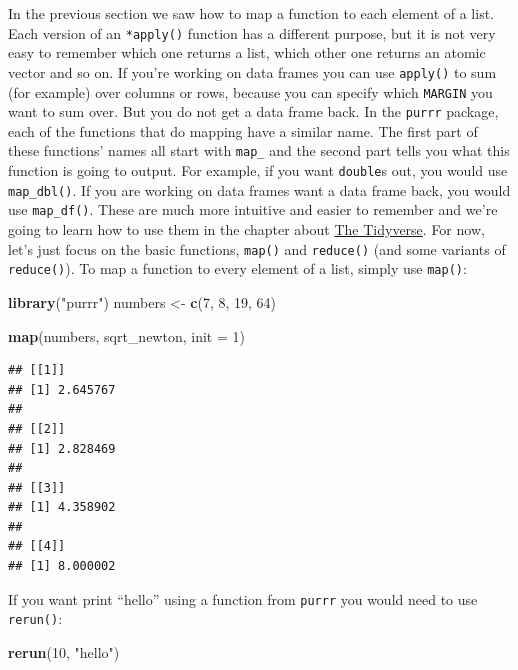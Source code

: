 \documentclass[]{gitbook}
\newenvironment{Shaded}{\begin{snugshade}}{\end{snugshade}}
\newcommand{\DataTypeTok}[1]{\textcolor[rgb]{0.13,0.29,0.53}{#1}}
\newcommand{\DecValTok}[1]{\textcolor[rgb]{0.00,0.00,0.81}{#1}}
\newcommand{\KeywordTok}[1]{\textcolor[rgb]{0.13,0.29,0.53}{\textbf{#1}}}
\newcommand{\NormalTok}[1]{#1}
\newcommand{\StringTok}[1]{\textcolor[rgb]{0.31,0.60,0.02}{#1}}
\begin{document}
In the previous section we saw how to map a function to each element of a list. Each version of an
\texttt{*apply()} function has a different purpose, but it is not very easy to remember which one returns
a list, which other one returns an atomic vector and so on. If you're working on data frames you
can use \texttt{apply()} to sum (for example) over columns or rows, because you can specify which \texttt{MARGIN}
you want to sum over. But you do not get a data frame back. In the \texttt{purrr} package, each of the
functions that do mapping have a similar name. The first part of these functions' names all start
with \texttt{map\_} and the second part tells you what this function is going to output. For example, if
you want \texttt{double}s out, you would use \texttt{map\_dbl()}. If you are working on data frames want a data
frame back, you would use \texttt{map\_df()}. These are much more intuitive and easier to remember and we're
going to learn how to use them in the chapter about \protect\hyperlink{tidyverse}{The Tidyverse}. For now, let's just focus on
the basic functions, \texttt{map()} and \texttt{reduce()} (and some variants of \texttt{reduce()}). To map a function
to every element of a list, simply use \texttt{map()}:

\begin{Shaded}
\begin{Highlighting}[]
\KeywordTok{library}\NormalTok{(}\StringTok{"purrr"}\NormalTok{)}
\NormalTok{numbers <-}\StringTok{ }\KeywordTok{c}\NormalTok{(}\DecValTok{7}\NormalTok{, }\DecValTok{8}\NormalTok{, }\DecValTok{19}\NormalTok{, }\DecValTok{64}\NormalTok{)}

\KeywordTok{map}\NormalTok{(numbers, sqrt_newton, }\DataTypeTok{init =} \DecValTok{1}\NormalTok{)}
\end{Highlighting}
\end{Shaded}

\begin{verbatim}
## [[1]]
## [1] 2.645767
## 
## [[2]]
## [1] 2.828469
## 
## [[3]]
## [1] 4.358902
## 
## [[4]]
## [1] 8.000002
\end{verbatim}

If you want print ``hello'' using a function from \texttt{purrr} you would need to use \texttt{rerun()}:

\begin{Shaded}
\begin{Highlighting}[]
\KeywordTok{rerun}\NormalTok{(}\DecValTok{10}\NormalTok{, }\StringTok{"hello"}\NormalTok{)}
\end{Highlighting}
\end{Shaded}
\end{document}

